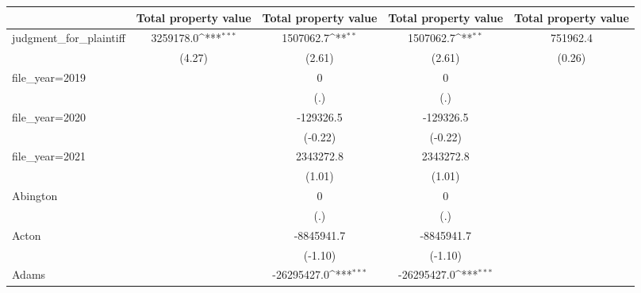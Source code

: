 {
\def\sym#1{\ifmmode^{#1}\else\(^{#1}\)\fi}
\begin{tabular}{l*{4}{c}}
\toprule
                    &\multicolumn{1}{c}{\hspace{0.25cm}Total property value}&\multicolumn{1}{c}{\hspace{0.25cm}Total property value}&\multicolumn{1}{c}{\hspace{0.25cm}Total property value}&\multicolumn{1}{c}{\hspace{0.25cm}Total property value}\\
\midrule
judgment\_for\_plaintiff&   3259178.0\sym{***}&   1507062.7\sym{**} &   1507062.7\sym{**} &    751962.4         \\
                    &      (4.27)         &      (2.61)         &      (2.61)         &      (0.26)         \\
\addlinespace
file\_year=2019      &                     &           0         &           0         &                     \\
                    &                     &         (.)         &         (.)         &                     \\
\addlinespace
file\_year=2020      &                     &   -129326.5         &   -129326.5         &                     \\
                    &                     &     (-0.22)         &     (-0.22)         &                     \\
\addlinespace
file\_year=2021      &                     &   2343272.8         &   2343272.8         &                     \\
                    &                     &      (1.01)         &      (1.01)         &                     \\
\addlinespace
Abington            &                     &           0         &           0         &                     \\
                    &                     &         (.)         &         (.)         &                     \\
\addlinespace
Acton               &                     &  -8845941.7         &  -8845941.7         &                     \\
                    &                     &     (-1.10)         &     (-1.10)         &                     \\
\addlinespace
Adams               &                     & -26295427.0\sym{***}& -26295427.0\sym{***}&                     \\

\end{tabular}}
